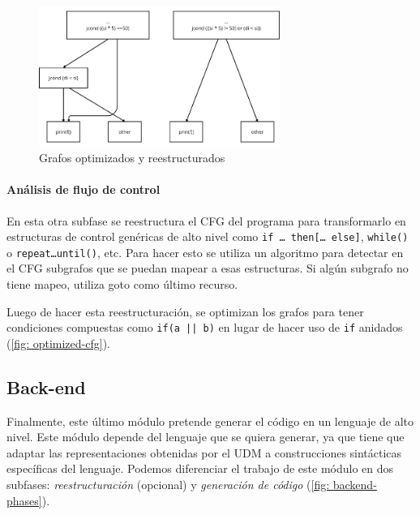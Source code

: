 \documentclass[runningheads]{llncs}
\begin{document}
\begin{figure}[!htb]
  \centering
  \includegraphics[width=0.7\textwidth]{optimized-cfg.png}
  \caption{Grafos optimizados y reestructurados}
  \label{fig: optimized-cfg}
  \vspace{-15pt}
\end{figure}

\paragraph{Análisis de flujo de control} En esta otra subfase se reestructura el CFG del programa para 
transformarlo en estructuras de control genéricas de alto nivel como \verb|if … then[… else]|, 
\verb|while()| o \verb|repeat…until()|, etc. Para hacer esto se utiliza un algoritmo para detectar 
en el CFG subgrafos que se puedan mapear a esas estructuras. Si algún subgrafo no tiene mapeo, 
utiliza goto como último recurso.

Luego de hacer esta reestructuración, se optimizan los grafos para tener condiciones compuestas 
como \verb+if(a || b)+ en lugar de hacer uso de \verb|if| anidados (\autoref{fig: optimized-cfg}).

\subsection{Back-end}
Finalmente, este último módulo pretende generar el código en un lenguaje de alto nivel. 
Este módulo depende del lenguaje que se quiera generar, ya que tiene que adaptar las representaciones 
obtenidas por el UDM a construcciones sintácticas específicas del lenguaje. Podemos diferenciar 
el trabajo de este módulo en dos subfases: \textit{reestructuración} (opcional) y 
\textit{generación de código} (\autoref{fig: backend-phases}).
\end{document}
